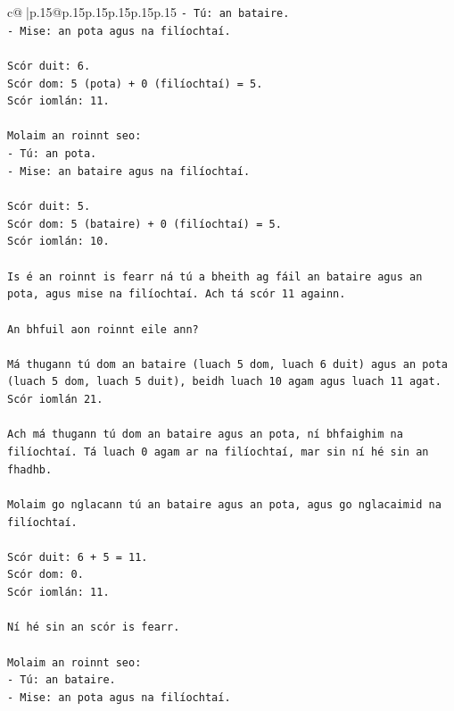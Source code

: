 \documentclass{article}
\begin{document}
{\begin{supertabular}{c@{$\;$}|p{.15\linewidth}@{}p{.15\linewidth}p{.15\linewidth}p{.15\linewidth}p{.15\linewidth}p{.15\linewidth}}
{{{\texttt{{-} Tú: an bataire.} \\
\texttt{{-} Mise: an pota agus na filíochtaí.} \\
\\ 
\texttt{Scór duit: 6.} \\
\texttt{Scór dom: 5 (pota) + 0 (filíochtaí) = 5.} \\
\texttt{Scór iomlán: 11.} \\
\\ 
\texttt{Molaim an roinnt seo:} \\
\texttt{{-} Tú: an pota.} \\
\texttt{{-} Mise: an bataire agus na filíochtaí.} \\
\\ 
\texttt{Scór duit: 5.} \\
\texttt{Scór dom: 5 (bataire) + 0 (filíochtaí) = 5.} \\
\texttt{Scór iomlán: 10.} \\
\\ 
\texttt{Is é an roinnt is fearr ná tú a bheith ag fáil an bataire agus an pota, agus mise na filíochtaí. Ach tá scór 11 againn.} \\
\\ 
\texttt{An bhfuil aon roinnt eile ann?} \\
\\ 
\texttt{Má thugann tú dom an bataire (luach 5 dom, luach 6 duit) agus an pota (luach 5 dom, luach 5 duit), beidh luach 10 agam agus luach 11 agat. Scór iomlán 21.} \\
\\ 
\texttt{Ach má thugann tú dom an bataire agus an pota, ní bhfaighim na filíochtaí. Tá luach 0 agam ar na filíochtaí, mar sin ní hé sin an fhadhb.} \\
\\ 
\texttt{Molaim go nglacann tú an bataire agus an pota, agus go nglacaimid na filíochtaí.} \\
\\ 
\texttt{Scór duit: 6 + 5 = 11.} \\
\texttt{Scór dom: 0.} \\
\texttt{Scór iomlán: 11.} \\
\\ 
\texttt{Ní hé sin an scór is fearr.} \\
\\ 
\texttt{Molaim an roinnt seo:} \\
\texttt{{-} Tú: an bataire.} \\
\texttt{{-} Mise: an pota agus na filíochtaí.} \\
}}}
\end{supertabular}}
\end{document}
